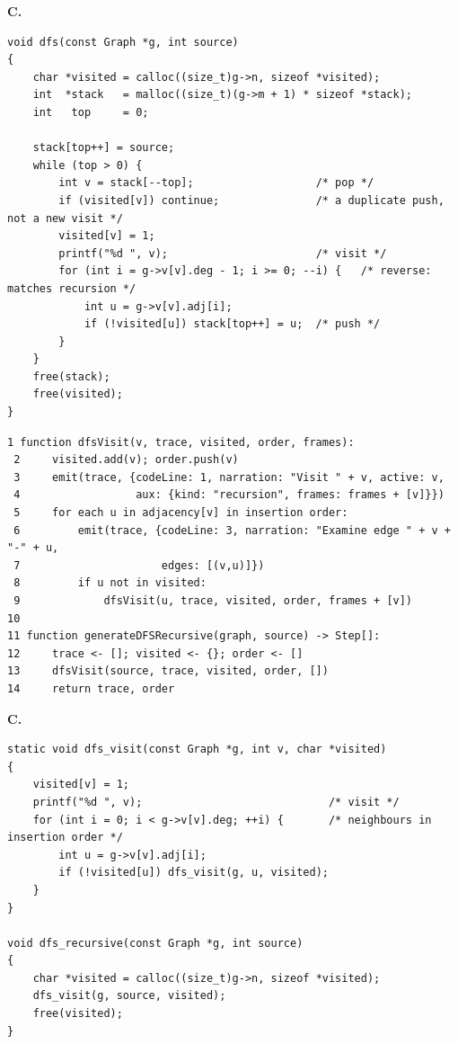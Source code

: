 \documentclass[11pt,a4paper]{article}
\begin{document}
\smallskip
\noindent\textbf{C.}
\begin{lstlisting}[style=c,caption={Depth-first search in C, iterative. The stack is a plain array bounded by the edge count.},label={lst:c-dfsiter}]
void dfs(const Graph *g, int source)
{
    char *visited = calloc((size_t)g->n, sizeof *visited);
    int  *stack   = malloc((size_t)(g->m + 1) * sizeof *stack);
    int   top     = 0;

    stack[top++] = source;
    while (top > 0) {
        int v = stack[--top];                   /* pop */
        if (visited[v]) continue;               /* a duplicate push, not a new visit */
        visited[v] = 1;
        printf("%d ", v);                       /* visit */
        for (int i = g->v[v].deg - 1; i >= 0; --i) {   /* reverse: matches recursion */
            int u = g->v[v].adj[i];
            if (!visited[u]) stack[top++] = u;  /* push */
        }
    }
    free(stack);
    free(visited);
}
\end{lstlisting}

\begin{lstlisting}[style=pseudo,caption={Instrumented depth-first search, recursive. This is the
same algorithm with the call stack as the frontier, and it is the mode that connects to the
recursion frames of Section~3.1--3.3.},label={lst:dfsrec}]
 1 function dfsVisit(v, trace, visited, order, frames):
 2     visited.add(v); order.push(v)
 3     emit(trace, {codeLine: 1, narration: "Visit " + v, active: v,
 4                  aux: {kind: "recursion", frames: frames + [v]}})
 5     for each u in adjacency[v] in insertion order:
 6         emit(trace, {codeLine: 3, narration: "Examine edge " + v + "-" + u,
 7                      edges: [(v,u)]})
 8         if u not in visited:
 9             dfsVisit(u, trace, visited, order, frames + [v])
10
11 function generateDFSRecursive(graph, source) -> Step[]:
12     trace <- []; visited <- {}; order <- []
13     dfsVisit(source, trace, visited, order, [])
14     return trace, order
\end{lstlisting}

\smallskip
\noindent\textbf{C.}
\begin{lstlisting}[style=c,caption={Depth-first search in C, recursive. The call stack is the frontier.},label={lst:c-dfsrec}]
static void dfs_visit(const Graph *g, int v, char *visited)
{
    visited[v] = 1;
    printf("%d ", v);                             /* visit */
    for (int i = 0; i < g->v[v].deg; ++i) {       /* neighbours in insertion order */
        int u = g->v[v].adj[i];
        if (!visited[u]) dfs_visit(g, u, visited);
    }
}

void dfs_recursive(const Graph *g, int source)
{
    char *visited = calloc((size_t)g->n, sizeof *visited);
    dfs_visit(g, source, visited);
    free(visited);
}
\end{lstlisting}
\end{document}
